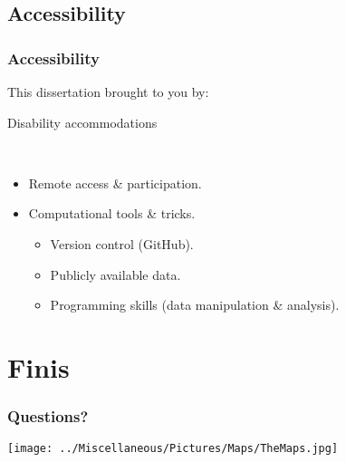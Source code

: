 \documentclass[14pt]{beamer}
\begin{document}
\subsection{Accessibility}
\begin{frame}[t]{}
\frametitle{Accessibility}
\begin{center}
This dissertation brought to you by:
\end{center}
\begin{Large}
Disability accommodations\\
\end{Large}
~\\
\begin{itemize}
\item Remote access \& participation.\\
\item Computational tools \& tricks.
\begin{itemize}
\item Version control (GitHub).
\item Publicly available data.
\item Programming skills (data manipulation \& analysis).
\end{itemize}
\end{itemize}
\end{frame}

\section{Finis}
\begin{frame}[t]
\frametitle{Questions?}
\begin{center}
\texttt{[image: ../Miscellaneous/Pictures/Maps/TheMaps.jpg]}
\end{center}
\end{frame}
\end{document}
